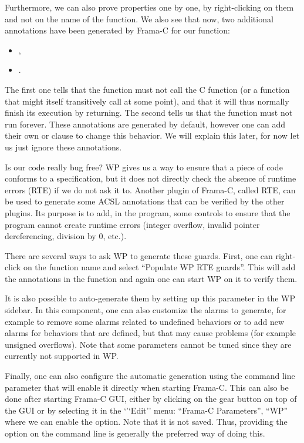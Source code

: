 Furthermore, we can also prove properties one by one, by right-clicking on them
and not on the name of the function. We also see that now, two additional
annotations have been generated by Frama-C for our function:
\begin{itemize}
  \item {},
  \item {}.
\end{itemize}
The first one tells that the function must not call the C 
function (or a function that might itself transitively call 
at some point), and that it will thus normally finish its execution by
returning. The second tells us that the function must not run forever. These
annotations are generated by default, however one can add  their own
 or  clause to change this behavior.
We will explain this later, for now let us just ignore these annotations.



Is our code really bug free? WP gives us a way to ensure that a piece of code
conforms to a specification, but it does not directly check the absence
of runtime errors (RTE) if we do not ask it to. Another plugin of Frama-C,
called RTE, can be used to generate some ACSL annotations that can be verified
by the other plugins. Its purpose is to add, in the program, some controls to
ensure that the program cannot create runtime errors (integer overflow,
invalid pointer dereferencing, division by 0, etc.).


There are several ways to ask WP to generate these guards. First, one can
right-click on the function name and select ``Populate WP RTE guards''. This
will add the annotations in the function and again one can start WP on it to
verify them.




It is also possible to auto-generate them by setting up this parameter in the WP
sidebar. In this component, one can also customize the alarms to generate, for
example to remove some alarms related to undefined behaviors or to add new
alarms for behaviors that are defined, but that may cause problems (for example
unsigned overflows). Note that some parameters cannot be tuned since they are
currently not supported in WP.




Finally, one can also configure the automatic generation using the command line
parameter  that will enable it directly when starting Frama-C.
This can also be done after starting Frama-C GUI, either by clicking on the gear
button on top of the GUI or by selecting it in the `'`Edit'' menu:
``Frama-C Parameters'', ``WP''
where we can enable the  option. Note that it is not saved.
Thus, providing the option  on the command line is generally
the preferred way of doing this.


